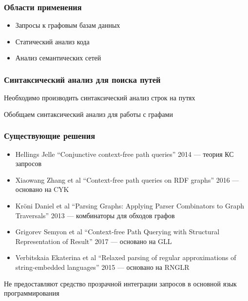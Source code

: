 \documentclass[xcolor=table]{beamer}
\begin{document}
\begin{frame}[fragile]
  \transwipe[direction=90]
  \frametitle{Области применения}
\begin{itemize}
	\item Запросы к графовым базам данных
	\item Статический анализ кода
	\item Анализ семантических сетей
\end{itemize}
\end{frame}


\begin{frame}[fragile]
  \transwipe[direction=90]
  \frametitle{Синтаксический анализ для поиска путей}

Необходимо производить синтаксический анализ строк на путях

\bigskip

Обобщаем синтаксический анализ для работы с графами

\end{frame}


\begin{frame}
  \transwipe[direction=90]
  \frametitle{Существующие решения}

  \begin{itemize}
      \item Hellings Jelle ``Conjunctive context-free path queries'' 2014 --- теория КС запросов
      \item Xiaowang Zhang et al ``Context-free path queries on RDF graphs'' 2016 --- основано на CYK
      \item Kröni Daniel et al ``Parsing Graphs: Applying Parser Combinators to Graph Traversals'' 2013 --- комбинаторы для обходов графов
      \item Grigorev Semyon et al ``Context-free Path Querying with Structural Representation of Result'' 2017 --- основано на GLL
      \item Verbitskaia Ekaterina et al ``Relaxed parsing of regular approximations of string-embedded languages'' 2015 --- основано на RNGLR
  \end{itemize}

Не предоставляют средство прозрачной интеграции запросов в основной язык программирования

\end{frame}
\end{document}
